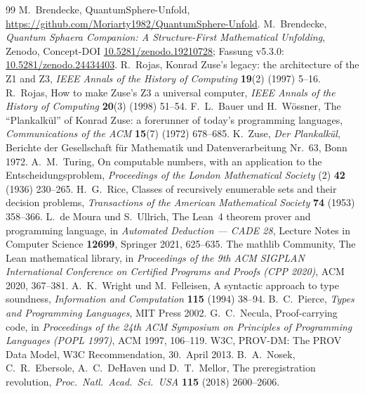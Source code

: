 \documentclass[11pt]{article}
\theoremstyle{definition}
\theoremstyle{remark}
\begin{document}
\begingroup\footnotesize
\begin{thebibliography}{99}
\setlength{\itemsep}{1pt}
 M.~Brendecke, QuantumSphere-Unfold, \url{https://github.com/Moriarty1982/QuantumSphere-Unfold}.
 M.~Brendecke, \emph{Quantum Sphaera Companion: A Structure-First Mathematical Unfolding}, Zenodo, Concept-DOI
\href{https://doi.org/10.5281/zenodo.19210728}{10.5281/zenodo.19210728}; Fassung v5.3.0:
\href{https://doi.org/10.5281/zenodo.24434403}{10.5281/zenodo.24434403}.
 R.~Rojas, Konrad Zuse's legacy: the architecture of the Z1 and Z3, \emph{IEEE Annals of the History of Computing}
\textbf{19}(2) (1997) 5--16.
 R.~Rojas, How to make Zuse's Z3 a universal computer, \emph{IEEE Annals of the History of Computing} \textbf{20}(3)
(1998) 51--54.
 F.~L.~Bauer und H.~Wössner, The ``Plankalkül'' of Konrad Zuse: a forerunner of today's programming languages,
\emph{Communications of the ACM} \textbf{15}(7) (1972) 678--685.
 K.~Zuse, \emph{Der Plankalkül}, Berichte der Gesellschaft für Mathematik und Datenverarbeitung Nr.~63, Bonn 1972.
 A.~M.~Turing, On computable numbers, with an application to the Entscheidungsproblem, \emph{Proceedings of the London
Mathematical Society} (2) \textbf{42} (1936) 230--265.
 H.~G.~Rice, Classes of recursively enumerable sets and their decision problems, \emph{Transactions of the American
Mathematical Society} \textbf{74} (1953) 358--366.
 L.~de Moura und S.~Ullrich, The Lean~4 theorem prover and programming language, in \emph{Automated Deduction --- CADE 28},
Lecture Notes in Computer Science \textbf{12699}, Springer 2021, 625--635.
 The mathlib Community, The Lean mathematical library, in \emph{Proceedings of the 9th ACM SIGPLAN International Conference
on Certified Programs and Proofs (CPP 2020)}, ACM 2020, 367--381.
 A.~K.~Wright und M.~Felleisen, A syntactic approach to type soundness, \emph{Information and Computation} \textbf{115}
(1994) 38--94.
 B.~C.~Pierce, \emph{Types and Programming Languages}, MIT Press 2002.
 G.~C.~Necula, Proof-carrying code, in \emph{Proceedings of the 24th ACM Symposium on Principles of Programming
Languages (POPL 1997)}, ACM 1997, 106--119.
 W3C, PROV-DM: The PROV Data Model, W3C Recommendation, 30.~April 2013.
 B.~A.~Nosek, C.~R.~Ebersole, A.~C.~DeHaven und D.~T.~Mellor, The preregistration revolution, \emph{Proc.\ Natl.\ Acad.\ Sci.\ USA}
\textbf{115} (2018) 2600--2606.

\end{thebibliography}
\end{document}
